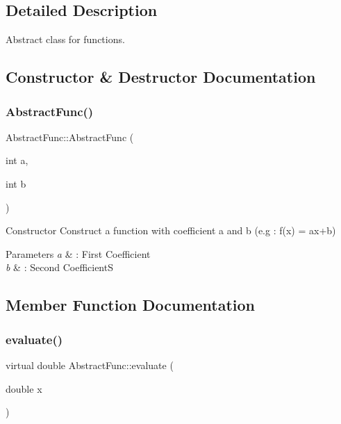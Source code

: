 \subsection{Detailed Description}
Abstract class for functions. 

\subsection{Constructor \& Destructor Documentation}
\mbox{\label{classAbstractFunc_a2f8a88c02beff30adb2eb54346e8bb0f}} 
\subsubsection{\texorpdfstring{Abstract\+Func()}{AbstractFunc()}}
{\footnotesize\ttfamily Abstract\+Func\+::\+Abstract\+Func (\begin{DoxyParamCaption}\item[{int}]{a,  }\item[{int}]{b }\end{DoxyParamCaption})\hspace{0.3cm}{\ttfamily [inline]}}



Constructor Construct a function with coefficient a and b (e.\+g \+: f(x) = ax+b) 


\begin{DoxyParams}{Parameters}
{\em a} & \+: First Coefficient \\
\hline
{\em b} & \+: Second CoefficientS \\
\hline
\end{DoxyParams}


\subsection{Member Function Documentation}
\mbox{\label{classAbstractFunc_ac98be1daa5131b9fddcfdba0a2c34871}} 
\subsubsection{\texorpdfstring{evaluate()}{evaluate()}}
{\footnotesize\ttfamily virtual double Abstract\+Func\+::evaluate (\begin{DoxyParamCaption}\item[{double}]{x }\end{DoxyParamCaption})\hspace{0.3cm}{\ttfamily [pure virtual]}}




